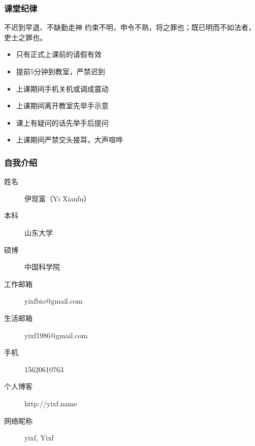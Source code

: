 \begin{frame}
  \frametitle{课堂纪律}
  \begin{alertblock}{不迟到早退、不缺勤走神}
  约束不明，申令不熟，将之罪也；既已明而不如法者，吏士之罪也。
  \end{alertblock}
  \pause
  \begin{itemize}[<+->]
    \item 只有正式上课前的请假有效
    \item 提前5分钟到教室，严禁迟到
    \item 上课期间手机关机或调成震动
    \item 上课期间离开教室先举手示意
    \item 课上有疑问的话先举手后提问
    \item 上课期间严禁交头接耳，大声喧哗
  \end{itemize}
\end{frame}

\begin{frame}
  \frametitle{自我介绍}
    \begin{description}
      \item[姓\qquad 名]伊现富（Yi Xianfu）
      \item[本\qquad 科]山东大学
      \item[硕\qquad 博]中国科学院
      \item[工作邮箱]\alert{yixfbio@gmail.com}
      \item[生活邮箱]yixf1986@gmail.com
      \item[手\qquad 机]\alert{15620610763}
      \item[个人博客]\alert{http://yixf.name}
      \item[网络昵称]yixf, Yixf
    \end{description}
\end{frame}

